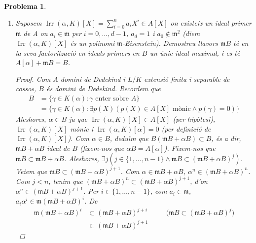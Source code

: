 \documentclass{article}
\DeclareMathOperator{\Irr}{Irr}
\newtheorem{problema}{Problema}
\begin{document}
\begin{problema}
\begin{enumerate}
\begin{proof}
            Ara, considerem l'ideal d'$A$ $\beta A$, on $\beta\in A$ és tal que $\beta B\subset B'$. Tenim $B=B'+\beta B\subset B'+B'=B'\subset B$, d'on per doble inclusió tenim $B=B'$.
        \end{proof}
        \item Suposem $\Irr(\alpha,K)[X]=\sum_{i=0}^{n}a_{i}X^{i}\in A[X]$ on existeix un ideal primer $\mathfrak{m}$ de A on $a_{i}\in\mathfrak{m}$ per $i=0,\ldots,d-1$, $a_{d}=1$ i $a_{0}\notin\mathfrak{m}^{2}$ (diem $\Irr(\alpha,K)[X]$ és un polinomi $\mathfrak{m}$-Eisenstein). Demostreu llavors $\mathfrak{m}B$ té en la seva factorització en ideals primers en $B$ un únic ideal maximal, i es té $A[\alpha]+\mathfrak{m}B=B$.
        \begin{proof}
            Com $A$ domini de Dedekind i $L/K$ extensió finita i separable de cossos, $B$ és domini de Dedekind. Recordem que
            \begin{align*}
                B
                &=\{\gamma\in K(\alpha):\gamma\textrm{ enter sobre }A\}\\
                &=\{\gamma\in K(\alpha):\exists p(X)(p(X)\in A[X]\textrm{ mònic}\land p(\gamma)=0)\}
            \end{align*}
            Aleshores, $\alpha\in B$ ja que $\Irr(\alpha,K)[X]\in A[X]$ (per hipòtesi), $\Irr(\alpha,K)[X]$ mònic i $\Irr(\alpha,K)[\alpha]=0$ (per definició de $\Irr(\alpha,K)[X]$). Com $\alpha\in B$, deduïm que $B(\mathfrak{m}B+\alpha B)\subset B$, és a dir, $\mathfrak{m}B+\alpha B$ ideal de $B$ (fixem-nos que $\alpha B=A[\alpha]$).\newline
            Fixem-nos que $\mathfrak{m}B\subset\mathfrak{m}B+\alpha B$. Aleshores, $\exists j(j\in\{1,\ldots,n-1\}\land\mathfrak{m}B\subset(\mathfrak{m}B+\alpha B)^{j})$.
            Veiem que $\mathfrak{m}B\subset(\mathfrak{m}B+\alpha B)^{j+1}$. Com $\alpha\in\mathfrak{m}B+\alpha B$, $\alpha^{n}\in(\mathfrak{m}B+\alpha B)^{n}$. Com $j<n$, tenim que $(\mathfrak{m}B+\alpha B)^{n}\subset(\mathfrak{m}B+\alpha B)^{j+1}$, d'on $\alpha^{n}\in(\mathfrak{m}B+\alpha B)^{j+1}$. Per $i\in\{1,\ldots,n-1\}$, com $a_{i}\in\mathfrak{m}$, $a_{i}\alpha^{i}\in\mathfrak{m}(\mathfrak{m}B+\alpha B)^{i}$. De
            \begin{align*}
                \mathfrak{m}(\mathfrak{m}B+\alpha B)^{i}
                &\subset
                (\mathfrak{m}B+\alpha B)^{j+i}
                &\quad&\textrm{($\mathfrak{m}B\subset(\mathfrak{m}B+\alpha B)^{j}$)}
                \\
                &\subset(\mathfrak{m}B+\alpha B)^{j+1}

\end{align*}
\end{proof}
\end{enumerate}
\end{problema}
\end{document}

